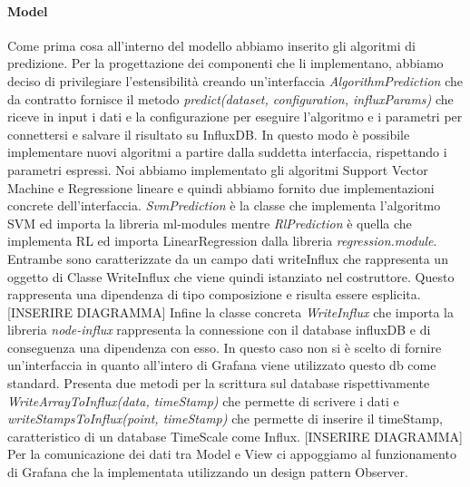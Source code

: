 			\paragraph{Model}
			Come prima cosa all'interno del modello abbiamo inserito gli algoritmi di predizione. Per la progettazione dei componenti che li implementano, abbiamo deciso di privilegiare l'estensibilità creando un'interfaccia \textit{AlgorithmPrediction} che da contratto fornisce il metodo \textit{predict(dataset, configuration, influxParams)} che riceve in input i dati e la configurazione per eseguire l'algoritmo e i parametri per connettersi e salvare il risultato su InfluxDB.
			In questo modo è possibile implementare nuovi algoritmi a partire dalla suddetta interfaccia, rispettando i parametri espressi. Noi abbiamo implementato gli algoritmi Support Vector Machine e Regressione lineare e quindi abbiamo fornito due implementazioni concrete dell'interfaccia.
			\textit{SvmPrediction} è la classe che implementa l'algoritmo SVM ed importa la libreria ml-modules mentre \textit{RlPrediction} è quella che implementa RL ed importa LinearRegression dalla libreria \textit{regression.module}. Entrambe sono caratterizzate da un campo dati writeInflux che rappresenta un oggetto di Classe WriteInflux che viene quindi istanziato nel costruttore. Questo rappresenta una dipendenza di tipo composizione e risulta essere esplicita. [INSERIRE DIAGRAMMA]
			Infine la classe concreta \textit{WriteInflux} che importa la libreria \textit{node-influx} rappresenta la connessione con il database influxDB e di conseguenza una dipendenza con esso. In questo caso non si è scelto di fornire un'interfaccia in quanto all'intero di Grafana viene utilizzato questo db come standard. Presenta due metodi per la scrittura sul database rispettivamente \textit{WriteArrayToInflux(data, timeStamp)} che permette di scrivere i dati e \textit{writeStampsToInflux(point, timeStamp)} che permette di inserire il timeStamp, caratteristico di un database TimeScale come Influx. 
			[INSERIRE DIAGRAMMA]
			Per la comunicazione dei dati tra Model e View ci appoggiamo al funzionamento di Grafana che la implementata utilizzando un design pattern Observer. 
